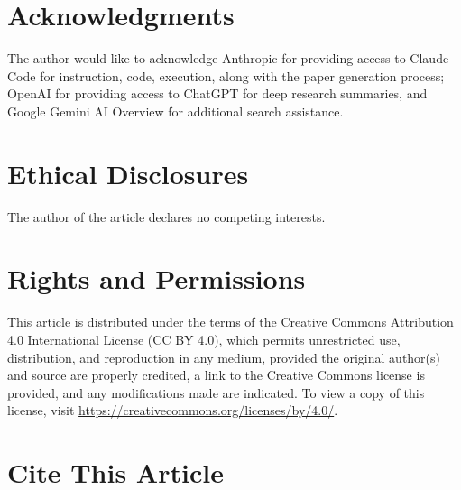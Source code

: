 %
%

{}
\section*{Acknowledgments}

The author would like to acknowledge Anthropic for providing access to
Claude Code for instruction, code, execution, along with the paper
generation process; OpenAI for providing access to ChatGPT for deep
research summaries, and Google Gemini AI Overview for additional
search assistance.

{}
\section*{Ethical Disclosures}

The author of the article declares no competing interests.

{}
\section*{Rights and Permissions}

This article is distributed under the terms of the Creative Commons
Attribution 4.0 International License (CC BY 4.0), which permits
unrestricted use, distribution, and reproduction in any medium,
provided the original author(s) and source are properly credited, a
link to the Creative Commons license is provided, and any
modifications made are indicated. To view a copy of this license,
visit \href{https://creativecommons.org/licenses/by/4.0/}{https://creativecommons.org/licenses/by/4.0/}.

{}
\section*{Cite This Article}

